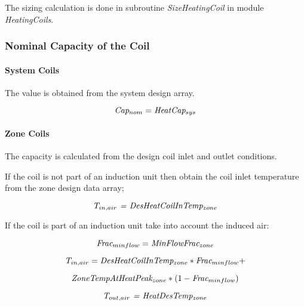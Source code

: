The sizing calculation is done in subroutine \emph{SizeHeatingCoil} in module \emph{HeatingCoils}.

\subsubsection{Nominal Capacity of the Coil}\label{nominal-capacity-of-the-coil}

\paragraph{System Coils}\label{system-coils-3}

The value is obtained from the system design array.

\begin{equation}
\emph{Cap\(_{nom}\)} = \emph{HeatCap\(_{sys}\)}
\end{equation}

\paragraph{Zone Coils}\label{zone-coils-3}

The capacity is calculated from the design coil inlet and outlet conditions.

If the coil is not part of an induction unit then obtain the coil inlet temperature from the zone design data array;

\begin{equation}
\emph{T\(_{in,air}\) = DesHeatCoilInTemp\(_{zone}\)}
\end{equation}

If the coil is part of an induction unit take into account the induced air:

\begin{equation}
\emph{Frac\(_{minflow}\)} = \emph{MinFlowFrac\(_{zone}\)}
\end{equation}

\begin{equation}
\emph{T\(_{in,air}\)} = \emph{DesHeatCoilInTemp\(_{zone}\)} * \emph{Frac\(_{minflow}\)} +
\end{equation}

\begin{equation}
\emph{ZoneTempAtHeatPeak\(_{zone}\)} *(1- \emph{Frac\(_{minflow}\)})
\end{equation}

\begin{equation}
\emph{T\(_{out,air}\) = HeatDesTemp\(_{zone}\)}
\end{equation}

